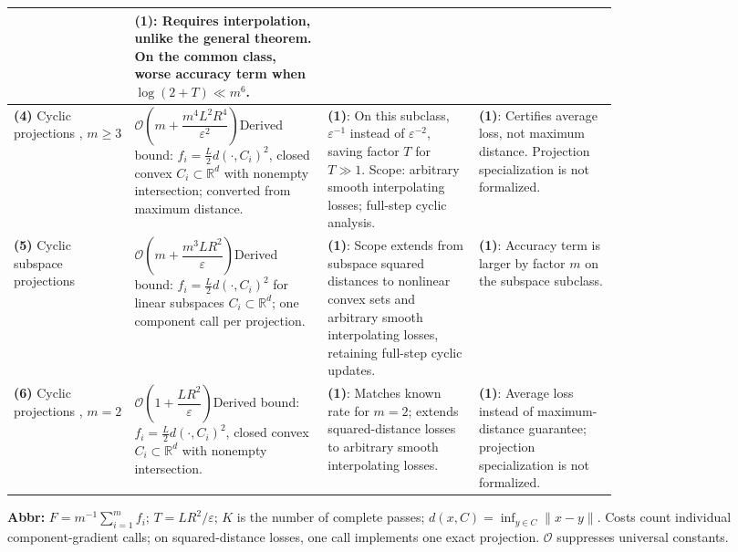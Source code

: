 \begin{table}[tp]
\begin{threeparttable}
\begin{tabularx}{\linewidth}{@{}>{\raggedright\arraybackslash}p{0.20\linewidth}>{\raggedright\arraybackslash}p{0.32\linewidth}>{\raggedright\arraybackslash}p{0.25\linewidth}>{\raggedright\arraybackslash}X@{}}
& \textbf{(1)}: Requires interpolation, unlike the general theorem. On the common class, worse accuracy term when $\log(2+T)\ll m^6$. \\
\midrule
\textbf{(4)} Cyclic projections \citep[Prop.~4.13]{ifsEvronEtAl2023}, $m\ge3$
& $\mathcal{O}\!\left(m+\dfrac{m^4L^2R^4}{\varepsilon^2}\right)$\newline Derived bound: $f_i=\tfrac L2 d(\cdot,C_i)^2$, closed convex $C_i\subset\mathbb R^d$ with nonempty intersection; converted from maximum distance.
& \textbf{(1)}: On this subclass, $\varepsilon^{-1}$ instead of $\varepsilon^{-2}$, saving factor $T$ for $T\gg1$. Scope: arbitrary smooth interpolating losses; full-step cyclic analysis.
& \textbf{(1)}: Certifies average loss, not maximum distance. Projection specialization is not formalized. \\
\midrule
\textbf{(5)} Cyclic subspace projections \citep[Thm.~1, Lem.~2]{ifsSwartworthEtAl2023}
& $\mathcal{O}\!\left(m+\dfrac{m^3LR^2}{\varepsilon}\right)$\newline Derived bound: $f_i=\tfrac L2 d(\cdot,C_i)^2$ for linear subspaces $C_i\subset\mathbb R^d$; one component call per projection.
& \textbf{(1)}: Scope extends from subspace squared distances to nonlinear convex sets and arbitrary smooth interpolating losses, retaining full-step cyclic updates.
& \textbf{(1)}: Accuracy term is larger by factor $m$ on the subspace subclass. \\
\midrule
\textbf{(6)} Cyclic projections \citep[Prop.~4.13]{ifsEvronEtAl2023}, $m=2$
& $\mathcal{O}\!\left(1+\dfrac{LR^2}{\varepsilon}\right)$\newline Derived bound: $f_i=\tfrac L2 d(\cdot,C_i)^2$, closed convex $C_i\subset\mathbb R^d$ with nonempty intersection.
& \textbf{(1)}: Matches known rate for $m=2$; extends squared-distance losses to arbitrary smooth interpolating losses.
& \textbf{(1)}: Average loss instead of maximum-distance guarantee; projection specialization is not formalized. \\
\bottomrule
\end{tabularx}
\begin{tablenotes}[flushleft]\footnotesize
\item[] \textbf{Abbr:} $F=m^{-1}\sum_{i=1}^m f_i$; $T=LR^2/\varepsilon$; $K$ is the number of complete passes; $d(x,C)=\inf_{y\in C}\|x-y\|$. Costs count individual component-gradient calls; on squared-distance losses, one call implements one exact projection. $\mathcal{O}$ suppresses universal constants.
\end{tablenotes}
\end{threeparttable}
\end{table}
\clearpage

